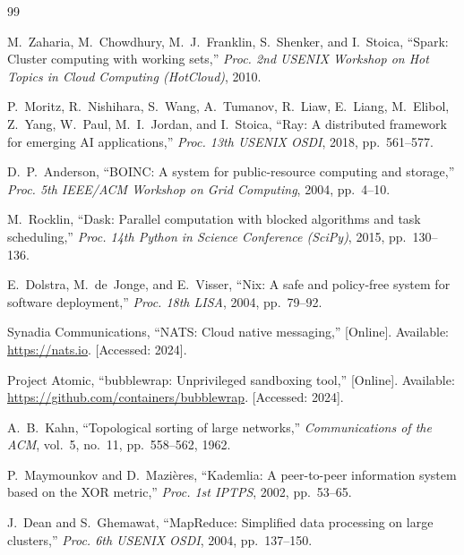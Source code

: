 \begin{thebibliography}{99}


M.~Zaharia, M.~Chowdhury, M.~J.~Franklin, S.~Shenker, and I.~Stoica,
``Spark: Cluster computing with working sets,''
\textit{Proc. 2nd USENIX Workshop on Hot Topics in Cloud Computing (HotCloud)}, 2010.

P.~Moritz, R.~Nishihara, S.~Wang, A.~Tumanov, R.~Liaw, E.~Liang, M.~Elibol,
Z.~Yang, W.~Paul, M.~I.~Jordan, and I.~Stoica,
``Ray: A distributed framework for emerging AI applications,''
\textit{Proc. 13th USENIX OSDI}, 2018, pp.~561--577.

D.~P.~Anderson,
``BOINC: A system for public-resource computing and storage,''
\textit{Proc. 5th IEEE/ACM Workshop on Grid Computing}, 2004, pp.~4--10.

M.~Rocklin,
``Dask: Parallel computation with blocked algorithms and task scheduling,''
\textit{Proc. 14th Python in Science Conference (SciPy)}, 2015, pp.~130--136.

E.~Dolstra, M.~de~Jonge, and E.~Visser,
``Nix: A safe and policy-free system for software deployment,''
\textit{Proc. 18th LISA}, 2004, pp.~79--92.

Synadia Communications,
``NATS: Cloud native messaging,''
[Online]. Available: \url{https://nats.io}. [Accessed: 2024].

Project Atomic,
``bubblewrap: Unprivileged sandboxing tool,''
[Online]. Available: \url{https://github.com/containers/bubblewrap}. [Accessed: 2024].

A.~B.~Kahn,
``Topological sorting of large networks,''
\textit{Communications of the ACM}, vol.~5, no.~11, pp.~558--562, 1962.

P.~Maymounkov and D.~Mazi\`eres,
``Kademlia: A peer-to-peer information system based on the XOR metric,''
\textit{Proc. 1st IPTPS}, 2002, pp.~53--65.

J.~Dean and S.~Ghemawat,
``MapReduce: Simplified data processing on large clusters,''
\textit{Proc. 6th USENIX OSDI}, 2004, pp.~137--150.


\end{thebibliography}
